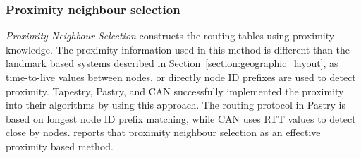 %
%

\subsubsection{Proximity neighbour selection}
\emph{Proximity Neighbour Selection} constructs the routing tables using
proximity knowledge. The proximity information used in this method is different
than the landmark based systems described in
Section~\ref{section:geographic_layout}, as time-to-live values between nodes,
or directly node ID prefixes are used to detect proximity. Tapestry, Pastry, and
CAN successfully implemented the proximity into their algorithms by using this
approach. The routing protocol in Pastry is based on longest node ID prefix
matching, while CAN uses RTT values to detect close by nodes.
\cite{castro_proximityp2p_2002} reports that proximity neighbour selection as an
effective proximity based method.
